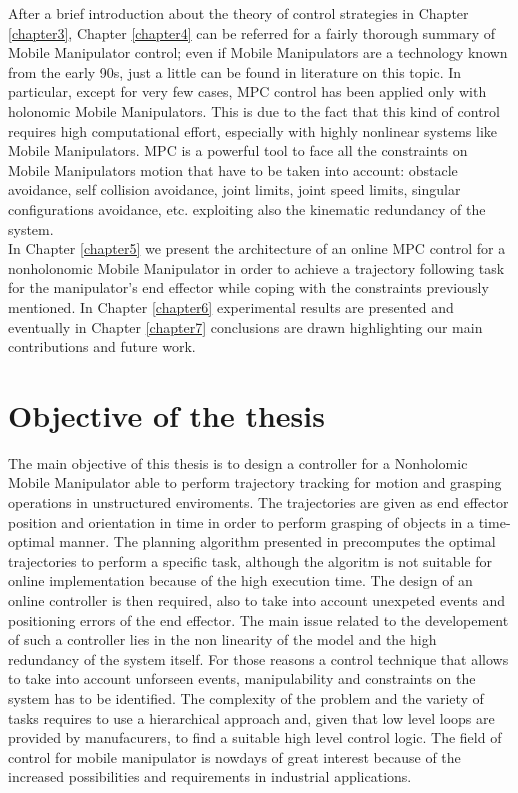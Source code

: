 After a brief introduction about the theory of control strategies in Chapter \ref{chapter3}, Chapter \ref{chapter4} can be referred for a fairly thorough summary of Mobile Manipulator control; even if Mobile Manipulators are a technology known from the early 90s, just a little can be found in literature on this topic. In particular, except for very few cases, MPC control has been applied only with holonomic Mobile Manipulators. This is due to the fact that this kind of control requires high computational effort, especially with highly nonlinear systems like Mobile Manipulators. MPC is a powerful tool to face all the constraints on Mobile Manipulators motion that have to be taken into account: obstacle avoidance, self collision avoidance, joint limits, joint speed limits, singular configurations avoidance, etc. exploiting also the kinematic redundancy of the system.\\
In Chapter \ref{chapter5} we present the architecture of an online MPC control for a nonholonomic Mobile Manipulator in order to achieve a trajectory following task for the manipulator's end effector while coping with the constraints previously mentioned. In Chapter \ref{chapter6} experimental results are presented and eventually in Chapter \ref{chapter7} conclusions are drawn highlighting our main contributions and future work.	

\section{Objective of the thesis}
The main objective of this thesis is to design a controller for a Nonholomic Mobile Manipulator able to perform trajectory tracking for motion and grasping operations in unstructured enviroments. The trajectories are given as end effector position and orientation in time in order to perform grasping of objects in a time-optimal manner. The planning algorithm presented in \cite{shantanuthakar} precomputes the optimal trajectories to perform a specific task, although the algoritm is not suitable for online implementation because of the high execution time. The design of an online controller is then required, also to take into account unexpeted events and positioning errors of the end effector. The main issue related to the developement of such a controller lies in the non linearity of the model and the high redundancy of the system itself. For those reasons a control technique that allows to take into account unforseen events, manipulability and constraints on the system has to be identified. The complexity of the problem and the variety of tasks requires to use a hierarchical approach and, given that low level loops are provided by manufacurers, to find a suitable high level control logic. The field of control for mobile manipulator is nowdays of great interest because of the increased possibilities and requirements in industrial applications.  



